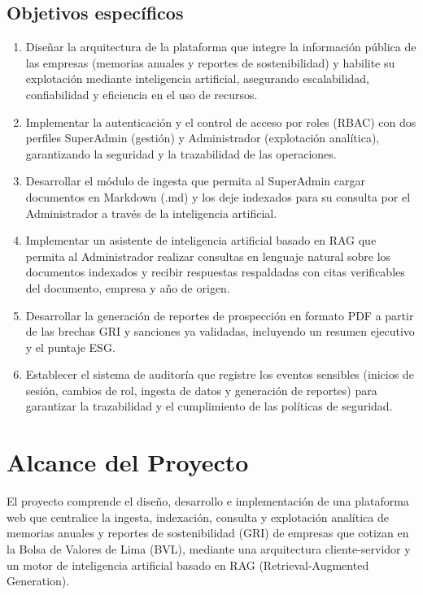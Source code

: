 \subsection{Objetivos específicos}
\begin{enumerate}[leftmargin=1.6em,itemsep=4pt,topsep=4pt]
  \item Diseñar la arquitectura de la plataforma que integre la información pública de las empresas (memorias anuales y reportes de sostenibilidad) y habilite su explotación mediante inteligencia artificial, asegurando escalabilidad, confiabilidad y eficiencia en el uso de recursos.
  \item Implementar la autenticación y el control de acceso por roles (RBAC) con dos perfiles SuperAdmin (gestión) y Administrador (explotación analítica), garantizando la seguridad y la trazabilidad de las operaciones.
  \item Desarrollar el módulo de ingesta que permita al SuperAdmin cargar documentos en Markdown (.md) y los deje indexados para su consulta por el Administrador a través de la inteligencia artificial.
  \item Implementar un asistente de inteligencia artificial basado en RAG que permita al Administrador realizar consultas en lenguaje natural sobre los documentos indexados y recibir respuestas respaldadas con citas verificables del documento, empresa y año de origen.
  \item Desarrollar la generación de reportes de prospección en formato PDF a partir de las brechas GRI y sanciones ya validadas, incluyendo un resumen ejecutivo y el puntaje ESG.
  \item Establecer el sistema de auditoría que registre los eventos sensibles (inicios de sesión, cambios de rol, ingesta de datos y generación de reportes) para garantizar la trazabilidad y el cumplimiento de las políticas de seguridad.
\end{enumerate}

\section{Alcance del Proyecto}
El proyecto comprende el diseño, desarrollo e implementación de una plataforma web que centralice la ingesta, indexación, consulta y explotación analítica de memorias anuales y reportes de sostenibilidad (GRI) de empresas que cotizan en la Bolsa de Valores de Lima (BVL), mediante una arquitectura cliente-servidor y un motor de inteligencia artificial basado en RAG (Retrieval-Augmented Generation).

